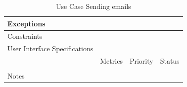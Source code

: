 \begin{table}[H]
\begin{tabularx}{\linewidth}{|l|X|X|X|}
            \hline Exceptions                    & \multicolumn{3}{l|}{}                                                                                 \\

            \hline Constraints                   & \multicolumn{3}{l|}{}                                                                                 \\

            \hline User Interface Specifications & \multicolumn{3}{l|}{}                                                                                 \\

            \hline \multirow{2}{*}{}             & Metrics                                                                           & Priority & Status \\
            \cline{2-4}                          &                                                                                   &          &        \\
            \hline Notes                         & \multicolumn{3}{l|}{}                                                                                 \\
            \hline
      \end{tabularx}
      \caption{Use Case Sending emails}
      \label{tab:use_case_sending_emails}
\end{table}

